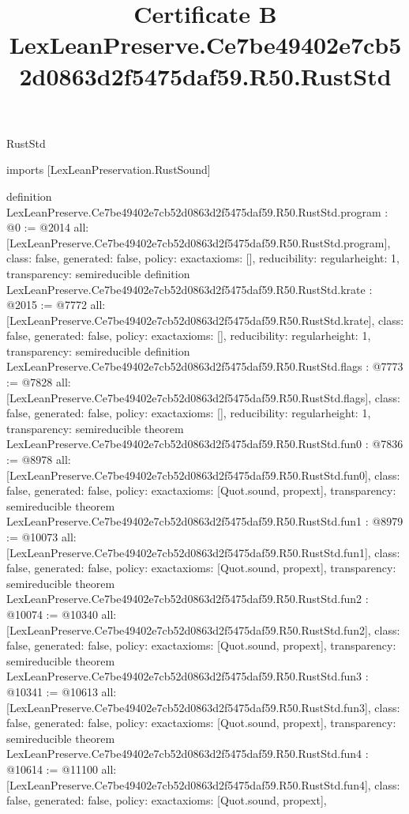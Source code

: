 \begin{lexlean}{RustStd}
\title{Certificate B LexLeanPreserve.Ce7be49402e7cb52d0863d2f5475daf59.R50.RustStd}
\begin{coremodule}
imports [LexLeanPreservation.RustSound]

definition LexLeanPreserve.Ce7be49402e7cb52d0863d2f5475daf59.R50.RustStd.program : @0 := @2014 {
  all: [LexLeanPreserve.Ce7be49402e7cb52d0863d2f5475daf59.R50.RustStd.program],
  class: false,
  generated: false,
  policy: exact{axioms: []},
  reducibility: regular{height: 1},
  transparency: semireducible
}
definition LexLeanPreserve.Ce7be49402e7cb52d0863d2f5475daf59.R50.RustStd.krate : @2015 := @7772 {
  all: [LexLeanPreserve.Ce7be49402e7cb52d0863d2f5475daf59.R50.RustStd.krate],
  class: false,
  generated: false,
  policy: exact{axioms: []},
  reducibility: regular{height: 1},
  transparency: semireducible
}
definition LexLeanPreserve.Ce7be49402e7cb52d0863d2f5475daf59.R50.RustStd.flags : @7773 := @7828 {
  all: [LexLeanPreserve.Ce7be49402e7cb52d0863d2f5475daf59.R50.RustStd.flags],
  class: false,
  generated: false,
  policy: exact{axioms: []},
  reducibility: regular{height: 1},
  transparency: semireducible
}
theorem LexLeanPreserve.Ce7be49402e7cb52d0863d2f5475daf59.R50.RustStd.fun0 : @7836 := @8978 {
  all: [LexLeanPreserve.Ce7be49402e7cb52d0863d2f5475daf59.R50.RustStd.fun0],
  class: false,
  generated: false,
  policy: exact{axioms: [Quot.sound, propext]},
  transparency: semireducible
}
theorem LexLeanPreserve.Ce7be49402e7cb52d0863d2f5475daf59.R50.RustStd.fun1 : @8979 := @10073 {
  all: [LexLeanPreserve.Ce7be49402e7cb52d0863d2f5475daf59.R50.RustStd.fun1],
  class: false,
  generated: false,
  policy: exact{axioms: [Quot.sound, propext]},
  transparency: semireducible
}
theorem LexLeanPreserve.Ce7be49402e7cb52d0863d2f5475daf59.R50.RustStd.fun2 : @10074 := @10340 {
  all: [LexLeanPreserve.Ce7be49402e7cb52d0863d2f5475daf59.R50.RustStd.fun2],
  class: false,
  generated: false,
  policy: exact{axioms: [Quot.sound, propext]},
  transparency: semireducible
}
theorem LexLeanPreserve.Ce7be49402e7cb52d0863d2f5475daf59.R50.RustStd.fun3 : @10341 := @10613 {
  all: [LexLeanPreserve.Ce7be49402e7cb52d0863d2f5475daf59.R50.RustStd.fun3],
  class: false,
  generated: false,
  policy: exact{axioms: [Quot.sound, propext]},
  transparency: semireducible
}
theorem LexLeanPreserve.Ce7be49402e7cb52d0863d2f5475daf59.R50.RustStd.fun4 : @10614 := @11100 {
  all: [LexLeanPreserve.Ce7be49402e7cb52d0863d2f5475daf59.R50.RustStd.fun4],
  class: false,
  generated: false,
  policy: exact{axioms: [Quot.sound, propext]},
}
\end{coremodule}
\end{lexlean}
